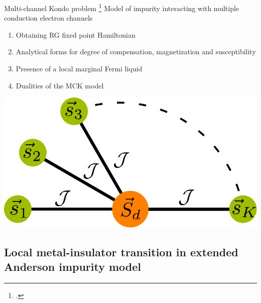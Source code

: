 \documentclass[11pt,aspectratio=169]{beamer}
\begin{document}
\begin{frame}{Multi-channel Kondo problem}
\footcite{Noz_blandin_1980,Tsvelick_weigmann_mchannel_1985,affleck1993exact,Gan_mchannel_1994,affleck_1991_overscreen,emery_kivelson,bulla_1998}
Model of impurity interacting with multiple conduction electron channels \\[20pt]

\begin{minipage}{0.59\textwidth}
	\begin{enumerate}
		\item Obtaining RG fixed point Hamiltonian\\[20pt]
	\item Analytical forms for degree of compensation, magnetization and susceptibility\\[20pt]
	\item Presence of a local marginal Fermi liquid\\[20pt]
	\item Dualities of the MCK model
\end{enumerate}
\end{minipage}
\begin{minipage}{0.4\textwidth}
	\includegraphics[width=\textwidth]{stargraph.pdf}
\end{minipage}

\end{frame}

\begin{frame}{}
\section{Local metal-insulator transition in extended Anderson impurity model}
\end{frame}
\end{document}
